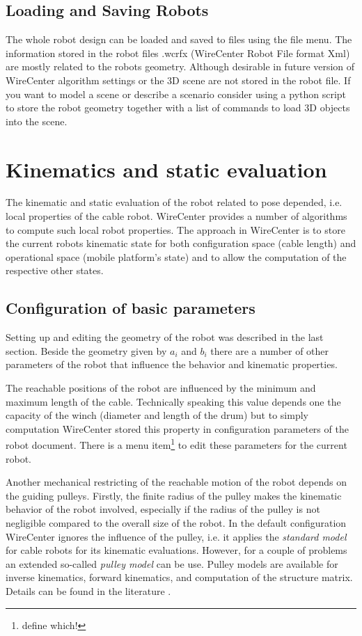 \documentclass[11pt,a4paper,onepage,openany]{book}
\begin{document}
\section{Loading and Saving Robots}
The whole robot design can be loaded and saved to files using the file menu.
The information stored in the robot files .wcrfx (WireCenter Robot File format
Xml) are mostly related to the robots geometry. Although desirable in future
version of WireCenter algorithm settings or the 3D scene are not stored in the
robot file. If you want to model a scene or describe a scenario consider using
a python script to store the robot geometry together with a list of commands to
load 3D objects into the scene.

\chapter{Kinematics and static evaluation}\label{sec:KinematicsStatics}%
The kinematic and static evaluation of the robot related to pose depended, i.e.
local properties of the cable robot. WireCenter provides a number of algorithms
to compute such local robot properties. The approach in WireCenter is to store
the current robots kinematic state for both configuration space (cable length)
and operational space (mobile platform's state) and to allow the computation of
the respective other states.

\section{Configuration of basic parameters}
Setting up and editing the geometry of the robot was described in the last
section. Beside the geometry given by $a_i$ and $b_i$ there are a number of
other parameters of the robot that influence the behavior and kinematic
properties.

The reachable positions of the robot are influenced by the minimum and maximum
length of the cable. Technically speaking this value depends one the capacity
of the winch (diameter and length of the drum) but to simply computation
WireCenter stored this property in configuration parameters of the robot
document. There is a menu item\footnote{define which!} to edit these parameters
for the current robot.

Another mechanical restricting of the reachable motion of the robot depends on
the guiding pulleys. Firstly, the finite radius of the pulley makes the
kinematic behavior of the robot involved, especially if the radius of the
pulley is not negligible compared to the overall size of the robot. In the
default configuration WireCenter ignores the influence of the pulley, i.e. it
applies the \emph{standard model} for cable robots for its kinematic
evaluations. However, for a couple of problems an extended so-called
\emph{pulley model} can be use. Pulley models are available for inverse
kinematics, forward kinematics, and computation of the structure matrix.
Details can be found in the literature \cite{Pott2012}.
\end{document}
